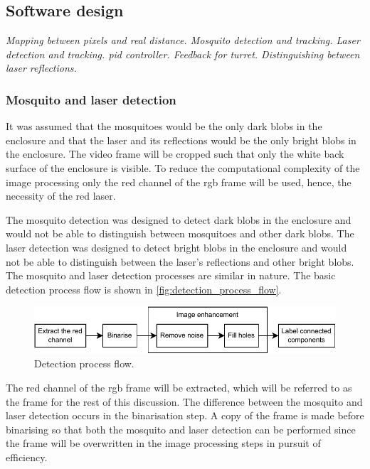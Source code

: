 \FloatBarrier
\subsection{Software design}
\textit{Mapping between pixels and real distance. Mosquito detection and tracking. Laser detection and tracking. \gls{pid} controller. Feedback for turret. Distinguishing between laser reflections.}



\subsubsection{Mosquito and laser detection} \label{subsubsec:mosquito_and_laser_detection}
It was assumed that the mosquitoes would be the only dark blobs in the enclosure and that the laser and its reflections would be the only bright blobs in the enclosure. The video frame will be cropped such that only the white back surface of the enclosure is visible. To reduce the computational complexity of the image processing only the red channel of the \gls{rgb} frame will be used, hence, the necessity of the red laser.

The mosquito detection was designed to detect dark blobs in the enclosure and would not be able to distinguish between mosquitoes and other dark blobs. The laser detection was designed to detect bright blobs in the enclosure and would not be able to distinguish between the laser's reflections and other bright blobs. The mosquito and laser detection processes are similar in nature. The basic detection process flow is shown in \autoref{fig:detection_process_flow}.
\begin{figure}[h]
    \centering
    \includegraphics[width=\textwidth]{figures/detection/detection_process_flow.pdf}
    \caption{Detection process flow.}
    \label{fig:detection_process_flow}
\end{figure}
The red channel of the \gls{rgb} frame will be extracted, which will be referred to as the frame for the rest of this discussion. The difference between the mosquito and laser detection occurs in the binarisation step. A copy of the frame is made before binarising so that both the mosquito and laser detection can be performed since the frame will be overwritten in the image processing steps in pursuit of efficiency.


